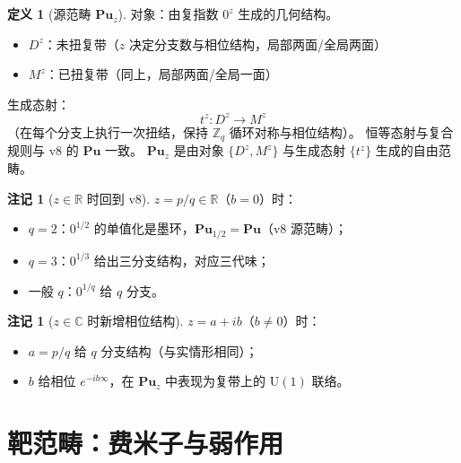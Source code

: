 \documentclass[11pt]{ctexart}
\theoremstyle{plain}
\theoremstyle{definition}
\newtheorem{defn}[thm]{定义}
\newtheorem{rem}[thm]{注记}
\newcommand{\Cat}{\mathbf}
\begin{document}
\begin{defn}[源范畴 $\Cat{Pu}_z$]\label{def:puz}
对象：由复指数 $0^z$ 生成的几何结构。
\begin{itemize}
\item $D^z$：未扭复带（$z$ 决定分支数与相位结构，局部两面/全局两面）
\item $M^z$：已扭复带（同上，局部两面/全局一面）
\end{itemize}
生成态射：
\[
t^z: D^z \to M^z
\]
（在每个分支上执行一次扭结，保持 $\mathbb{Z}_q$ 循环对称与相位结构）。
恒等态射与复合规则与 v8 的 $\Cat{Pu}$ 一致。
$\Cat{Pu}_z$ 是由对象 $\{D^z,M^z\}$ 与生成态射 $\{t^z\}$ 生成的自由范畴。
\end{defn}

\begin{rem}[$z\in\mathbb{R}$ 时回到 v8]\label{rem:backtov8}
$z = p/q\in\mathbb{R}$（$b=0$）时：
\begin{itemize}
\item $q=2$：$0^{1/2}$ 的单值化是墨环，$\Cat{Pu}_{1/2} = \Cat{Pu}$（v8 源范畴）；
\item $q=3$：$0^{1/3}$ 给出三分支结构，对应三代味；
\item 一般 $q$：$0^{1/q}$ 给 $q$ 分支。
\end{itemize}
\end{rem}

\begin{rem}[$z\in\mathbb{C}$ 时新增相位结构]\label{rem:complexcase}
$z = a+ib$（$b\neq 0$）时：
\begin{itemize}
\item $a = p/q$ 给 $q$ 分支结构（与实情形相同）；
\item $b$ 给相位 $e^{-ib\infty}$，在 $\Cat{Pu}_z$ 中表现为复带上的 $\mathrm{U}(1)$ 联络。
\end{itemize}
\end{rem}

\section{靶范畴：费米子与弱作用}
\end{document}
